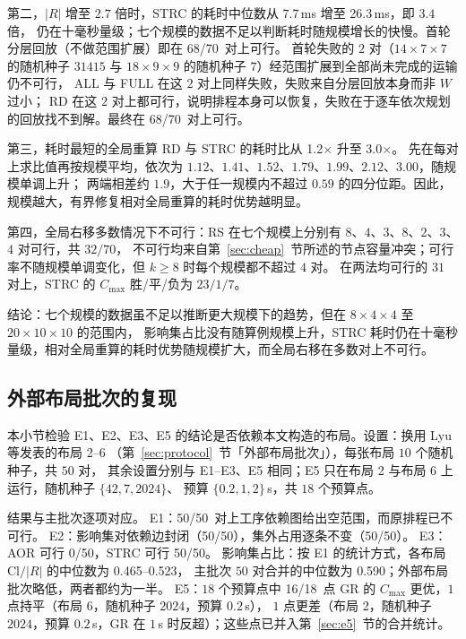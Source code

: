 \documentclass[manuscript,screen,review]{acmart}
\providecommand{\STRC}{\textsc{STRC}}
\newcommand{\NSeeds}{10}
\newcommand{\NPairs}{50}
\newcommand{\EoneFracMed}{0.590}    %
\newcommand{\NPubPairs}{50}
\newcommand{\PubPassMiss}{\NPubPairs/\NPubPairs}
\newcommand{\PubFeasRone}{0/\NPubPairs}
\newcommand{\PubFeasRtwo}{\NPubPairs/\NPubPairs}
\newcommand{\PubPassClosed}{\NPubPairs/\NPubPairs}
\newcommand{\PubPassInvar}{\NPubPairs/\NPubPairs}
\newcommand{\PubEoneFracLo}{0.465}
\newcommand{\PubEoneFracHi}{0.523}
\newcommand{\PubEfiveNoCross}{16/18}
\newcommand{\ScalePairs}{70}
\newcommand{\ScaleJobsHi}{20}
\newcommand{\ScaleMachHi}{10}
\newcommand{\ScaleMsHi}{26.3}  %
\newcommand{\ScaleRatioLo}{1.2}  %
\newcommand{\ScaleRatioHi}{3.0}  %
\newcommand{\ScaleFeasFirst}{68/\ScalePairs}   %
\newcommand{\ScaleFeasAll}{68/\ScalePairs}     %
\begin{document}
第二，\(|R|\) 增至 \(2.7\) 倍时，\STRC{} 的耗时中位数从 \(7.7\)\,ms 增至 \ScaleMsHi\,ms，即 \(3.4\) 倍，
仍在十毫秒量级；七个规模的数据不足以判断耗时随规模增长的快慢。首轮分层回放（不做范围扩展）即在 \ScaleFeasFirst\ 对上可行。
首轮失败的 \(2\) 对（\(14\times7\times7\) 的随机种子 \(31415\) 与 \(18\times9\times9\) 的随机种子 \(7\)）经范围扩展到全部尚未完成的运输仍不可行，
ALL 与 FULL 在这 \(2\) 对上同样失败，失败来自分层回放本身而非 \(W\) 过小；
RD 在这 \(2\) 对上都可行，说明排程本身可以恢复，失败在于逐车依次规划的回放找不到解。最终在 \ScaleFeasAll\ 对上可行。

第三，耗时最短的全局重算 RD 与 \STRC{} 的耗时比从 \ScaleRatioLo\(\times\) 升至 \ScaleRatioHi\(\times\)。
先在每对上求比值再按规模平均，依次为 \(1.12\)、\(1.41\)、\(1.52\)、\(1.79\)、\(1.99\)、\(2.12\)、\(3.00\)，随规模单调上升；
两端相差约 \(1.9\)，大于任一规模内不超过 \(0.59\) 的四分位距。因此，规模越大，有界修复相对全局重算的耗时优势越明显。

第四，全局右移多数情况下不可行：RS 在七个规模上分别有 \(8\)、\(4\)、\(3\)、\(8\)、\(2\)、\(3\)、\(4\) 对可行，共 \(32/\ScalePairs\)，
不可行均来自第~\ref{sec:cheap}~节所述的节点容量冲突；可行率不随规模单调变化，但 \(k\ge8\) 时每个规模都不超过 \(4\) 对。
在两法均可行的 \(31\) 对上，\STRC{} 的 \(C_{\max}\) 胜/平/负为 \(23/1/7\)。

结论：七个规模的数据虽不足以推断更大规模下的趋势，但在 \(8\times4\times4\) 至 \(\ScaleJobsHi\times\ScaleMachHi\times\ScaleMachHi\) 的范围内，
影响集占比没有随算例规模上升，\STRC{} 耗时仍在十毫秒量级，相对全局重算的耗时优势随规模扩大，而全局右移在多数对上不可行。

\subsection{外部布局批次的复现}
\label{sec:pubrepro}

本小节检验 E1、E2、E3、E5 的结论是否依赖本文构造的布局。设置：换用 Lyu 等发表的布局 2--6
（第~\ref{sec:protocol}~节「外部布局批次」），每张布局 \(\NSeeds\) 个随机种子，共 \(\NPubPairs\) 对，
其余设置分别与 E1--E3、E5 相同；E5 只在布局 2 与布局 6 上运行，随机种子 \(\{42,7,2024\}\)、
预算 \(\{0.2,1,2\}\)\,s，共 \(18\) 个预算点。

结果与主批次逐项对应。
E1：\PubPassMiss\ 对上工序依赖图给出空范围，而原排程已不可行。
E2：影响集对依赖边封闭（\PubPassClosed），集外占用逐条不变（\PubPassInvar）。
E3：AOR 可行 \PubFeasRone，\STRC{} 可行 \PubFeasRtwo。
影响集占比：按 E1 的统计方式，各布局 \(\mathrm{Cl}/|R|\) 的中位数为 \PubEoneFracLo--\PubEoneFracHi，
主批次 \(\NPairs\) 对合并的中位数为 \EoneFracMed；外部布局批次略低，两者都约为一半。
E5：\(18\) 个预算点中 \PubEfiveNoCross\ 点 GR 的 \(C_{\max}\) 更优，\(1\) 点持平（布局 6，随机种子 \(2024\)，预算 \(0.2\)\,s），
\(1\) 点更差（布局 2，随机种子 \(2024\)，预算 \(0.2\)\,s，GR 在 \(1\)\,s 时反超）；这些点已并入第~\ref{sec:e5}~节的合并统计。
\end{document}
